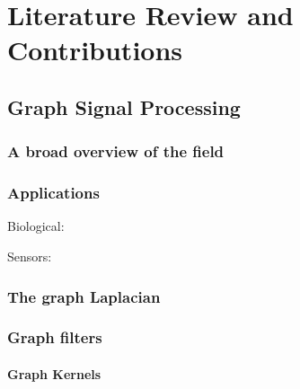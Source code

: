\chapter{Literature Review and Contributions} %

\label{chap:lit_review} %



\section{Graph Signal Processing}


\subsection{A broad overview of the field}

\subsection{Applications}

Biological: 

Sensors: \cite{Jablonski2017}


\subsection{The graph Laplacian}

\cite{LeMagoarou2016}


\subsection{Graph filters}

\subsubsection{Graph Kernels}

\cite{Kondor2002}

\cite{Smola2003}

\cite{Zhu2003}

\cite{Zhi2023}


